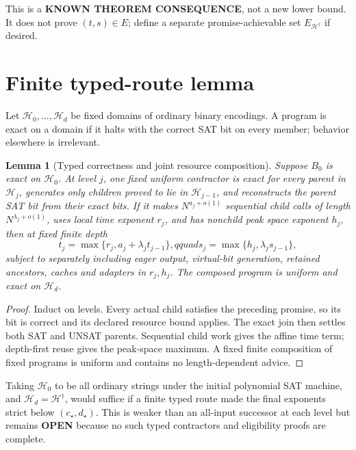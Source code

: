 \documentclass[11pt]{article}
\newtheorem{lemma}[theorem]{Lemma}
\newcommand{\OPEN}{\textbf{OPEN}}
\begin{document}
This is a \textbf{KNOWN THEOREM CONSEQUENCE}, not a new lower bound.  It
does not prove $(t,s)\in E$; define a separate promise-achievable set
$E_{\mathcal H^\dagger}$ if desired.

\section{Finite typed-route lemma}
Let $\mathcal H_0,\ldots,\mathcal H_d$ be fixed domains of ordinary binary
encodings.  A program is exact on a domain if it halts with the correct SAT bit
on every member; behavior elsewhere is irrelevant.

\begin{lemma}[Typed correctness and joint resource composition]
Suppose $B_0$ is exact on $\mathcal H_0$.  At level $j$, one fixed uniform
contractor is exact for every parent in $\mathcal H_j$, generates only children
proved to lie in $\mathcal H_{j-1}$, and reconstructs the parent SAT bit from
their exact bits.  If it makes $N^{a_j+o(1)}$ sequential child calls of length
$N^{\lambda_j+o(1)}$, uses local time exponent $r_j$, and has nonchild peak
space exponent $h_j$, then at fixed finite depth
\[
 t_j=\max\{r_j,a_j+\lambda_j t_{j-1}\},qquad
 s_j=\max\{h_j,\lambda_j s_{j-1}\},
\tag{2}
\]
subject to separately including eager output, virtual-bit generation, retained
ancestors, caches and adapters in $r_j,h_j$.  The composed program is uniform
and exact on $\mathcal H_d$.
\end{lemma}
\begin{proof}
Induct on levels.  Every actual child satisfies the preceding promise, so its
bit is correct and its declared resource bound applies.  The exact join then
settles both SAT and UNSAT parents.  Sequential child work gives the affine
time term; depth-first reuse gives the peak-space maximum.  A fixed finite
composition of fixed programs is uniform and contains no length-dependent
advice.
\end{proof}

Taking $\mathcal H_0$ to be all ordinary strings under the initial polynomial
SAT machine, and $\mathcal H_d=\mathcal H^\dagger$, would suffice if a finite
typed route made the final exponents strict below $(c_\star,d_\star)$.  This is
weaker than an all-input successor at each level but remains \OPEN{} because no
such typed contractors and eligibility proofs are complete.
\end{document}

